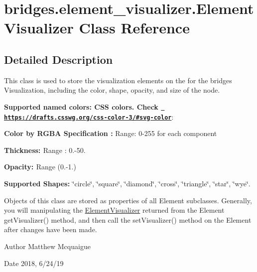 \hypertarget{classbridges_1_1element__visualizer_1_1_element_visualizer}{}\section{bridges.\+element\+\_\+visualizer.\+Element\+Visualizer Class Reference}
\label{classbridges_1_1element__visualizer_1_1_element_visualizer}


\subsection{Detailed Description}
This class is used to store the visualization elements on the for the bridges Visualization, including the color, shape, opacity, and size of the node. 

{\bfseries{Supported named colors\+: C\+SS colors. Check \href{https://drafts.csswg.org/css-color-3/\#svg-color}{\texttt{ https\+://drafts.\+csswg.\+org/css-\/color-\/3/\#svg-\/color}}}}\+: 

{\bfseries{ Color by R\+G\+BA Specification \+:}} Range\+: 0-\/255 for each component 

{\bfseries{ Thickness\+: }} Range \+: 0.-\/50.

{\bfseries{ Opacity\+: }} Range (0.-\/1.) 

{\bfseries{ Supported Shapes\+: }} \char`\"{}circle\char`\"{}, \char`\"{}square\char`\"{}, \char`\"{}diamond\char`\"{}, \char`\"{}cross\char`\"{}, \char`\"{}triangle\char`\"{}, \char`\"{}star\char`\"{}, \char`\"{}wye\char`\"{}.

Objects of this class are stored as properties of all Element subclasses. Generally, you will manipulating the \mbox{\hyperlink{classbridges_1_1element__visualizer_1_1_element_visualizer}{Element\+Visualizer}} returned from the Element get\+Visualizer() method, and then call the set\+Visualizer() method on the Element after changes have been made.

\begin{DoxyAuthor}{Author}
Matthew Mcquaigue
\end{DoxyAuthor}
\begin{DoxyDate}{Date}
2018, 6/24/19 
\end{DoxyDate}
